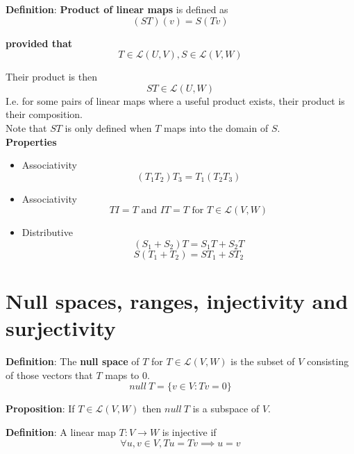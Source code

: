 \documentclass[a4paper, 10pt]{report}
\begin{document}
\begin{framed}
   \textbf{Definition}: \textbf{Product of linear maps} is defined as
   \[
      (ST)(v) = S(Tv)
   \] 

   \textbf{provided that }
   \[
      T \in \mathcal{L}(U, V), S \in \mathcal{L}(V, W)
   \] 

   Their product is then
   \[
      ST \in \mathcal{L}(U, W)
   \] 
   I.e. for some pairs of linear maps where a useful product exists, their product is their composition. \\

   Note that $ST$ is only defined when $T$ maps into the domain of $S$.  \\

   \textbf{Properties}
   \begin{itemize}
      \item Associativity
         \[
            (T_1 T_2) T_3 = T_1 (T_2 T_3)
         \] 
      \item Associativity
         \[
            TI = T \text{ and } IT = T \text{ for } T \in \mathcal{L}(V, W)
         \] 
      \item Distributive
         \[
            (S_1 + S_2) T = S_1 T + S_2 T
         \] 
         \[
           S(T_1 + T_2) = ST_1 + ST_2
         \] 
   \end{itemize}
\end{framed}

\section{Null spaces, ranges, injectivity and surjectivity}

\begin{framed}
   \textbf{Definition}: The \textbf{null space} of $T$ for $T \in \mathcal{L}(V, W)$ is the subset of $V$ consisting of those vectors that $T$ maps to $0$.
   \[
     null\ T = \{ v \in V: Tv = 0 \} 
   \] 
\end{framed}

\begin{framed}
   \textbf{Proposition}: If $T \in \mathcal{L}(V, W)$ then $null\ T$ is a subspace of $V$. 
\end{framed}

\begin{framed}
   \textbf{Definition}: A linear map $T: V \rightarrow W$ is injective if
    \[
     \forall u, v \in V, Tu = Tv \implies u = v
   \] 
\end{framed}
\end{document}
